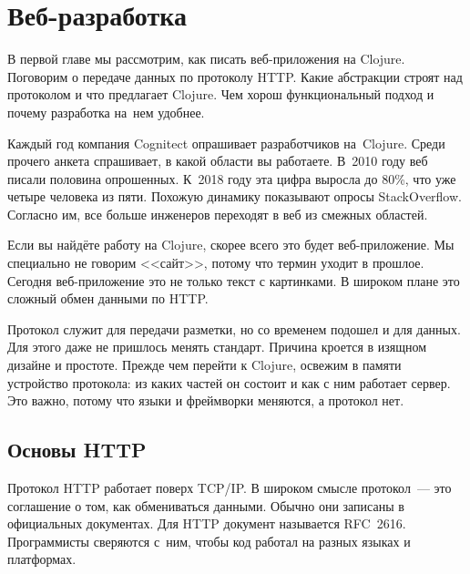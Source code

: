 \chapter{Веб-разработка}

\begin{teaser}
В первой главе мы рассмотрим, как писать веб-приложения на Clojure. Поговорим о
передаче данных по протоколу HTTP. Какие абстракции строят над протоколом и что
предлагает Clojure. Чем хорош функциональный подход и почему разработка на~нем
удобнее.
\end{teaser}



Каждый год компания Cognitect
опрашивает
разработчиков на~Clojure. Среди прочего анкета спрашивает, в какой области вы
работаете. В~2010 году веб писали половина опрошенных. К~2018 году эта цифра
выросла до 80\%, что уже четыре человека из пяти. Похожую динамику показывают
опросы StackOverflow. Согласно
им, все больше инженеров переходят в веб из смежных областей.

Если вы найд\"{е}те работу на Clojure, скорее всего это будет веб-приложение. Мы
специально не говорим <<сайт>>, потому что термин уходит в прошлое. Сегодня
веб-приложение это не только текст с картинками. В широком плане это сложный
обмен данными по HTTP.

Протокол служит для передачи разметки, но со временем подошел и для данных. Для
этого даже не пришлось менять стандарт. Причина кроется в изящном дизайне и
простоте. Прежде чем перейти к Clojure, освежим в памяти устройство
протокола: из каких частей он состоит и как с ним работает сервер. Это важно,
потому что языки и фреймворки меняются, а протокол нет.

\section{Основы HTTP}


Протокол HTTP работает поверх TCP/IP. В широком смысле протокол~--- это
соглашение о том, как обмениваться данными. Обычно они записаны в официальных
документах. Для HTTP документ называется
RFC~2616. Программисты
сверяются с~ним, чтобы код работал на разных языках и платформах.

